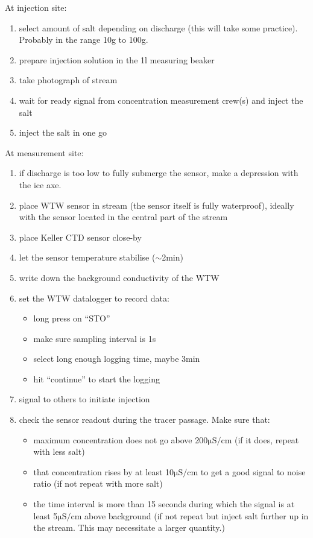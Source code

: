 \documentclass[DIV=15,halfparskip,11pt,headinclude]{scrartcl}
\begin{document}
At injection site:
\begin{enumerate}
\item select amount of salt depending on discharge (this will take some
practice).  Probably in the range 10g to 100g.
\item prepare injection solution in the 1l measuring beaker
 \item take photograph of stream
\item wait for ready signal from concentration measurement crew(s) and
  inject the salt
\item inject the salt in one go
\end{enumerate}

At measurement site:
\begin{enumerate}
\item if discharge is too low to fully submerge the sensor, make a
depression with the ice axe.
\item place WTW sensor in stream (the sensor itself is fully waterproof),
  ideally with the sensor located in the central part of the stream
\item place Keller CTD sensor close-by
\item let the sensor temperature stabilise ($\sim$2min)
\item write down the background conductivity of the WTW
\item set the WTW datalogger to record data:
\begin{itemize}
\item long press on ``STO''
\item make sure sampling interval is 1s
\item select long enough logging time, maybe 3min
\item hit ``continue'' to start the logging
\end{itemize}
\item signal to others to initiate injection
\item check the sensor readout during the tracer passage.  Make sure
  that:
\begin{itemize}
\item maximum concentration does not go above 200$\mathrm{\mu S/cm}$
  (if it does, repeat with less salt)
\item that concentration rises by at least 10$\mathrm{\mu S/cm}$ to get
  a good signal to noise ratio (if not repeat with more salt)
\item the time interval is more than 15 seconds during which the
  signal is at least 5$\mathrm{\mu S/cm}$ above background (if not
  repeat but inject salt further up in the stream.  This may
  necessitate a larger quantity.)
\end{itemize}
\end{enumerate}
\end{document}

